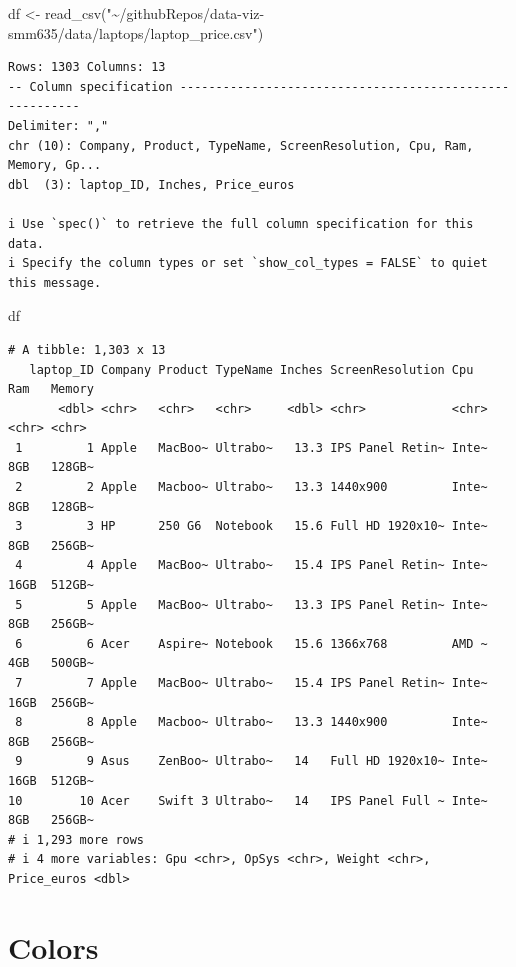 \documentclass[
  letterpaper,
]{article}
\newenvironment{Shaded}{\begin{snugshade}}{\end{snugshade}}
\newcommand{\FunctionTok}[1]{\textcolor[rgb]{0.28,0.35,0.67}{#1}}
\newcommand{\NormalTok}[1]{\textcolor[rgb]{0.00,0.23,0.31}{#1}}
\newcommand{\OtherTok}[1]{\textcolor[rgb]{0.00,0.23,0.31}{#1}}
\newcommand{\StringTok}[1]{\textcolor[rgb]{0.13,0.47,0.30}{#1}}
\begin{document}
\begin{Shaded}
\begin{Highlighting}[]
\NormalTok{df }\OtherTok{\textless{}{-}} \FunctionTok{read\_csv}\NormalTok{(}\StringTok{"\textasciitilde{}/githubRepos/data{-}viz{-}smm635/data/laptops/laptop\_price.csv"}\NormalTok{)}
\end{Highlighting}
\end{Shaded}

\begin{verbatim}
Rows: 1303 Columns: 13
-- Column specification --------------------------------------------------------
Delimiter: ","
chr (10): Company, Product, TypeName, ScreenResolution, Cpu, Ram, Memory, Gp...
dbl  (3): laptop_ID, Inches, Price_euros

i Use `spec()` to retrieve the full column specification for this data.
i Specify the column types or set `show_col_types = FALSE` to quiet this message.
\end{verbatim}

\begin{Shaded}
\begin{Highlighting}[]
\NormalTok{df}
\end{Highlighting}
\end{Shaded}

\begin{verbatim}
# A tibble: 1,303 x 13
   laptop_ID Company Product TypeName Inches ScreenResolution Cpu   Ram   Memory
       <dbl> <chr>   <chr>   <chr>     <dbl> <chr>            <chr> <chr> <chr> 
 1         1 Apple   MacBoo~ Ultrabo~   13.3 IPS Panel Retin~ Inte~ 8GB   128GB~
 2         2 Apple   Macboo~ Ultrabo~   13.3 1440x900         Inte~ 8GB   128GB~
 3         3 HP      250 G6  Notebook   15.6 Full HD 1920x10~ Inte~ 8GB   256GB~
 4         4 Apple   MacBoo~ Ultrabo~   15.4 IPS Panel Retin~ Inte~ 16GB  512GB~
 5         5 Apple   MacBoo~ Ultrabo~   13.3 IPS Panel Retin~ Inte~ 8GB   256GB~
 6         6 Acer    Aspire~ Notebook   15.6 1366x768         AMD ~ 4GB   500GB~
 7         7 Apple   MacBoo~ Ultrabo~   15.4 IPS Panel Retin~ Inte~ 16GB  256GB~
 8         8 Apple   Macboo~ Ultrabo~   13.3 1440x900         Inte~ 8GB   256GB~
 9         9 Asus    ZenBoo~ Ultrabo~   14   Full HD 1920x10~ Inte~ 16GB  512GB~
10        10 Acer    Swift 3 Ultrabo~   14   IPS Panel Full ~ Inte~ 8GB   256GB~
# i 1,293 more rows
# i 4 more variables: Gpu <chr>, OpSys <chr>, Weight <chr>, Price_euros <dbl>
\end{verbatim}

\section{Colors}\label{colors}
\end{document}
